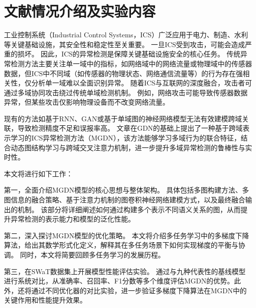 \section{文献情况介绍及实验内容}

工业控制系统（Industrial Control Systems，ICS）广泛应用于电力、制造、水利等关键基础设施，其安全性和稳定性至关重要。
一旦ICS受到攻击，可能会造成严重的损坏。
因此，ICS的异常检测是保障关键基础设施安全的核心任务。
传统异常检测方法主要关注单一域中的指标，如网络域中的网络流量或物理域中的传感器数据，但ICS中不同域（如传感器的物理状态、网络通信流量等）的行为存在强相关性，仅分析单一域难以全面识别异常。
随着ICS与互联网的深度融合，攻击者可通过多域协同攻击绕过传统单域检测机制。
例如，网络攻击可能导致传感器数据异常，但某些攻击仅影响物理设备而不改变网络流量。

现有的方法如基于RNN\cite{mandic2001recurrent}、GAN\cite{creswell2018generative}或基于单域图的神经网络模型无法有效建模跨域关联，导致检测精度不足和误报率高。
文章\cite{zhan2024anomaly}在GDN\cite{deng2021graph}的基础上提出了一种基于跨域表示学习的ICS异常检测方法（MGDN），该方法能够学习多域行为的联合特征，结合动态图结构学习与跨域交叉注意力机制，进一步提升多域异常检测的鲁棒性与实时性。

本文将进行如下工作：

第一，全面介绍MGDN模型的核心思想与整体架构。
具体包括多图构建方法、多图信息的融合策略、基于注意力机制的图卷积神经网络建模方式，以及最终融合输出的机制。
该部分将详细阐述如何通过构建多个表示不同语义关系的图，从而提升异常检测的表示能力和模型的泛化性能。

第二，深入探讨MGDN模型的优化策略。
本文将介绍多任务学习中的多梯度下降算法，给出其数学形式化定义，解释其在多任务场景下如何实现梯度的平衡与协调。
同时，本文将简要回顾多任务学习的发展历程。

第三，在SWaT数据集上开展模型性能评估实验。
通过与九种代表性的基线模型进行系统对比，从准确率、召回率、F1分数等多个维度评估MGDN的优势。此外，还将通过不同优化器的对比实验，进一步验证多梯度下降算法在MGDN中的关键作用和性能提升效果。
